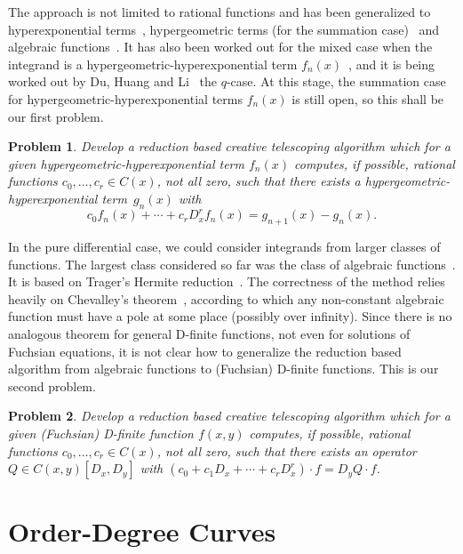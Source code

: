 \documentclass[a4paper,draft]{amsart}
\newtheorem{problem}{Problem}
\begin{document}
 The approach is not limited to rational functions and has been generalized to
 hyperexponential terms~\cite{bostan13a}, hypergeometric terms (for the summation
 case)~\cite{chen15a,huang16} and algebraic functions~\cite{chen16a}. It has also been worked
 out for the mixed case when the integrand is a hyper\-geo\-metric-hyper\-expo\-nen\-tial
 term $f_n(x)$~\cite{bostan16},
 and it is being worked out by Du, Huang and Li~\cite{li16}
 the $q$-case. At this stage, the summation case for hypergeometric-hyperexponential
 terms $f_n(x)$ is still open, so this shall be our first problem.

 \begin{problem}
   Develop a reduction based creative telescoping algorithm which for a given hyper\-geo\-me\-tric-hyperexponential
   term $f_n(x)$ computes, if possible, rational functions $c_0,\dots,c_r\in C(x)$, not all zero,
   such that there exists a hypergeometric-hyperexponential term~$g_n(x)$ with
   \[
    c_0 f_n(x) + \cdots + c_r D_x^r f_n(x) = g_{n+1}(x) - g_n(x).
   \]
 \end{problem}

 In the pure differential case, we could consider integrands from larger classes of
 functions. The largest class considered so far was the class of algebraic functions~\cite{chen16a}.
 It is based on Trager's Hermite reduction~\cite{trager84,bronstein98}. The correctness of the method relies
 heavily on Chevalley's theorem~\cite{chevalley51}, according to which any non-constant algebraic function must
 have a pole at some place (possibly over infinity). Since there is no analogous theorem
 for general D-finite functions, not even for solutions of Fuchsian equations, it is not clear
 how to generalize the reduction based algorithm from algebraic functions to (Fuchsian) D-finite
 functions. This is our second problem.

 \begin{problem}
   Develop a reduction based creative telescoping algorithm which for a given (Fuchsian) D-finite
   function $f(x,y)$ computes, if possible, rational functions $c_0,\dots,c_r\in C(x)$, not all zero, such
   that there exists an operator $Q\in C(x,y)[D_x,D_y]$ with $(c_0+c_1D_x+\cdots+c_rD_x^r)\cdot f = D_y Q\cdot f$.
 \end{problem}

 \section{Order-Degree Curves}
\end{document}
